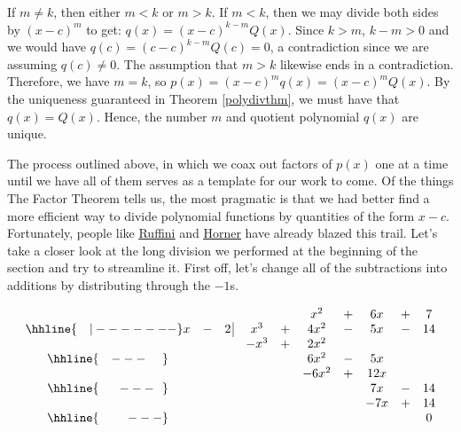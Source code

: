 \medskip

If $m \neq k$, then either $m<k$ or $m>k$.  If $m<k$, then we may divide both sides by $(x-c)^{m}$ to get: $q(x) = (x-c)^{k-m} Q(x)$.  Since $k>m$, $k-m>0$ and we would have $q(c) = (c-c)^{k-m} Q(c) = 0$, a contradiction since we are assuming $q(c) \neq 0$.   The assumption that $m>k$ likewise ends in a contradiction.   Therefore, we have $m = k$, so $p(x) = (x-c)^m q(x) = (x-c)^m Q(x)$.  By the uniqueness guaranteed in Theorem \ref{polydivthm}, we must have that $q(x) = Q(x)$.  Hence, the number $m$ and quotient polynomial $q(x)$ are unique. 

\medskip

The process outlined above, in which we coax out factors of $p(x)$ one at a time until we have all of them serves as a template for our work to come. Of the things The Factor Theorem tells us, the most pragmatic is that we had better find a more efficient way to divide polynomial functions by quantities of the form $x-c$.  Fortunately, people like \href{http://en.wikipedia.org/wiki/Synthetic_division}{\underline{Ruffini}} and \href{http://en.wikipedia.org/wiki/Horner_scheme}{\underline{Horner}} have already blazed this trail.  Let's take a closer look at the long division we performed at the beginning of the section and try to streamline it.  First off, let's change all of the subtractions into additions by distributing through the $-1$s.


\setlength\arraycolsep{0.1pt}
\setlength\extrarowheight{2pt}

\[ \begin{array}{cccccccccc}

& & & & & x^2 & + & 6x & + & 7 \\ \hhline{~~~|-------}

x & - & 2 \, \vline& x^3 & + & 4x^2 & - & 5x & - & 14 \\

 &  &  &  -x^3  & + &   2x^2 &  &  &  &  \\ \hhline{~~~---~~~~} 
 &  &  &   &  & 6 x^2 & - & 5x &  &  \\ 
 &  &  &   & &-6 x^2  & + &  12x &  &  \\ \hhline{~~~~~---~~} 
 &  &  &   &   &  & & 7x  & - & 14 \\
 &  &  &   &   &  & & - 7x  & + &  14  \\ \hhline{~~~~~~~---} 
 &   &  &  &  &  &  &  &  & 0
 
\end{array}\]

